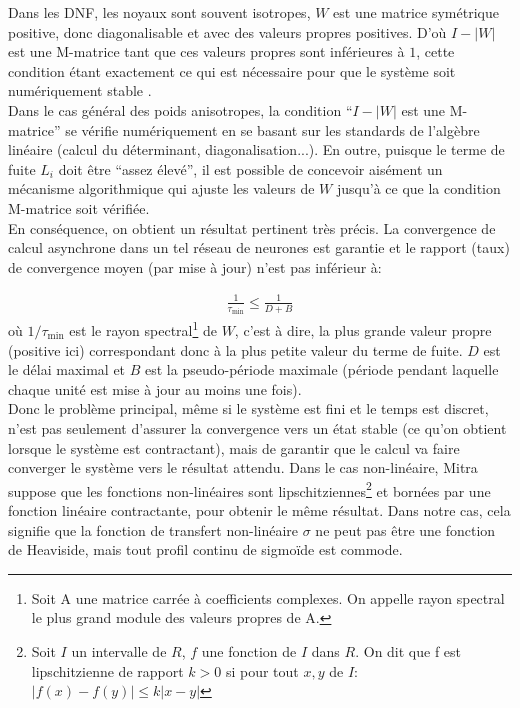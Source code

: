 Dans les DNF, les noyaux sont souvent isotropes, $ {W} $ est une matrice symétrique positive, donc diagonalisable et avec des valeurs propres positives. D'o\`u ${I} - |{W}|$ est une M-matrice tant que ces valeurs propres sont inférieures à $1$, cette condition étant exactement ce qui est nécessaire pour que le système soit numériquement stable \cite{Alexandre:2009}.\\

Dans le cas général des poids anisotropes, la condition ``$I - |W|$ est une M-matrice'' se vérifie numériquement en se basant sur les standards de l'algèbre linéaire (calcul du déterminant, diagonalisation...). En outre, puisque le terme de fuite $L_i $ doit être ``assez élevé'', il est possible de concevoir aisément un mécanisme algorithmique qui ajuste les valeurs de ${W}$ jusqu'à ce que la condition M-matrice soit vérifiée.\\

En conséquence, on obtient un résultat pertinent très précis. La convergence de calcul asynchrone dans un tel réseau de neurones est garantie et le rapport (taux) de convergence moyen (par mise à jour) n'est pas inférieur à:

\begin{align}
\label{eq: convergence}
\frac{1}{\tau_{\min}} \leq \frac{1}{D + B}
\end{align}
où $ 1/ \tau_{\min} $ est le rayon spectral\footnote{Soit A une matrice carrée à coefficients complexes. On appelle rayon spectral le plus grand module des valeurs propres de A.} de $ {W} $, c'est à dire, la plus grande valeur propre (positive ici) correspondant donc à la plus petite valeur du terme de fuite. $D$ est le délai maximal et $B$ est la pseudo-période maximale (période pendant laquelle chaque unité est mise à jour au moins une fois).\\

Donc le problème principal, même si le système est fini et le temps est discret, n'est pas seulement d'assurer la convergence vers un état stable (ce qu'on obtient lorsque le système est contractant), mais de garantir que le calcul va faire converger le système vers le résultat attendu. Dans le cas non-linéaire, Mitra suppose que les fonctions non-linéaires sont lipschitziennes\footnote{Soit $I$ un intervalle de $R$, $f$ une fonction de $I$ dans $R$. On dit que f est lipschitzienne de rapport $k>0$ si pour tout $x,y$ de $I$: $|f(x)-f(y)|\le k|x-y|$} et bornées par une fonction linéaire contractante, pour obtenir le même résultat. Dans notre cas, cela signifie que la fonction de transfert non-linéaire $\sigma$ ne peut pas être une fonction de Heaviside, mais tout profil continu de sigmoïde est commode. \\ %


